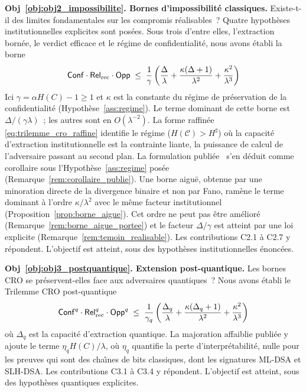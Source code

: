 \begin{sloppypar}
\textbf{Obj~\ref{obj:obj2_impossibilite}. Bornes d'impossibilit\'e classiques.} Existe-t-il des limites
fondamentales sur les compromis r\'ealisables~? Quatre hypoth\`eses
institutionnelles explicites sont pos\'ees. Sous trois d'entre elles, l'extraction
born\'ee, le verdict efficace et le r\'egime de confidentialit\'e, nous avons \'etabli la borne
\begin{equation}
  \mathsf{Conf} \cdot \mathsf{Rel}_{\mathrm{rec}} \cdot \mathsf{Opp} \;\leq\;
  \frac{1}{\gamma}\left(\frac{\Delta}{\lambda} + \frac{\kappa(\Delta+1)}{\lambda^2} + \frac{\kappa^2}{\lambda^3}\right)
\end{equation}
Ici $\gamma = \alpha H(C) - 1 \geq 1$ et $\kappa$ est la constante du
r\'egime de pr\'eservation de la confidentialit\'e
(Hypoth\`ese~\ref{ass:regime}). Le terme dominant de cette borne est
$\Delta/(\gamma\lambda)$~; les autres sont en $O(\lambda^{-2})$. La forme raffin\'ee
\eqref{eq:trilemme_cro_raffine} identifie le r\'egime ($H(\mathcal{C}) > H^\sharp$) o\`u la
capacit\'e d'extraction institutionnelle est la contrainte liante, la puissance
de calcul de l'adversaire passant au second plan. La formulation
publi\'ee~\cite{MINKA2026CRO} s'en d\'eduit comme corollaire sous l'Hypoth\`ese~\ref{ass:regime} pos\'ee (Remarque~\ref{rem:corollaire_publie}). Une borne aigu\"e, obtenue par une minoration directe de la divergence binaire et non par Fano, ram\`ene le terme dominant \`a l'ordre $\kappa/\lambda^2$ avec le m\^eme facteur institutionnel (Proposition~\ref{prop:borne_aigue}). Cet ordre ne peut pas \^etre am\'elior\'e (Remarque~\ref{rem:borne_aigue_portee}) et le facteur $\Delta/\gamma$ est atteint par une loi explicite (Remarque~\ref{rem:temoin_realisable}). Les contributions C2.1 \`a C2.7 y r\'epondent. L'objectif est atteint, sous des hypoth\`eses institutionnelles \'enonc\'ees.

\textbf{Obj~\ref{obj:obj3_postquantique}. Extension post-quantique.} Les bornes CRO
se pr\'eservent-elles face aux adversaires quantiques~? Nous avons \'etabli
le Trilemme CRO post-quantique
\begin{equation}
  \mathsf{Conf}^q \cdot \mathsf{Rel}_{\mathrm{rec}}^q \cdot \mathsf{Opp}^q \;\leq\;
  \frac{1}{\gamma_q}\left(\frac{\Delta_q}{\lambda} + \frac{\kappa(\Delta_q+1)}{\lambda^2} + \frac{\kappa^2}{\lambda^3}\right)
\end{equation}
o\`u $\Delta_q$ est la capacit\'e d'extraction quantique. La majoration affaiblie publi\'ee y ajoute
le terme $\eta_q H(C)/\lambda$, o\`u $\eta_q$ quantifie
la perte d'interpr\'etabilit\'e, nulle pour les preuves qui sont des cha\^{\i}nes
de bits classiques, dont les signatures ML-DSA et SLH-DSA. Les contributions C3.1 \`a C3.4
y r\'epondent. L'objectif est atteint, sous des hypoth\`eses quantiques explicites.


\end{sloppypar}
